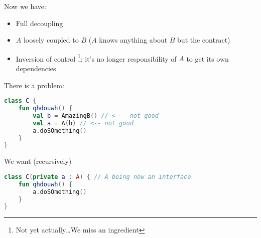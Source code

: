 \documentclass[10pt]{beamer}
\newcommand{\mycomment}[1]{}
\begin{document}
\begin{frame}[fragile]
	Now we have:
	\begin{itemize}
		\item Full decoupling
		\item $A$ loosely coupled to $B$ ($A$ knows anything about $B$ but the contract) 
		\item Inversion of control%
			\footnote{Not yet actually\ldots We miss an ingredient}: it's no longer responsibility of $A$ to get its own dependencies 
	\end{itemize}
\end{frame}
\mycomment{
\begin{frame}[fragile]
\begin{lstlisting}[language=Kotlin, basicstyle=\ttfamily]
interface Transaction

interface Store { // repository/gateway pattern
    fun fetch(id : String) : Transaction
}

class UseCase(val store: Store) { /* .. */ }

\end{lstlisting} 
\end{frame}
\begin{frame}[fragile]
\begin{lstlisting}[language=Kotlin, basicstyle=\ttfamily]
class BaseStore : Store {
    override fun fetch(id : String): Transaction {/*...*/}
}

// Delegation pattern
class StoreA(val store: Store) : Store by store {
    override fun fetch(id : String): Transactions {
        /* do something */
    }
}

// Delegation pattern 
class StoreB(val store: Store) : Store by store {
    override fun fetch(id : String): Transactions {
        /* do something else */
    }
}
\end{lstlisting} 
\end{frame}
}
\begin{frame}[fragile]
	There is a problem:
\begin{lstlisting}[language=Kotlin, basicstyle=\ttfamily]
class C {
    fun qhdouwh() {
        val b = AmazingB() // <--  not good 
        val a = A(b) // <-- not good 
        a.doSOmething()
    }
}
\end{lstlisting} 
\end{frame}
\begin{frame}[fragile]
	We want (recursively) 
\begin{lstlisting}[language=Kotlin, basicstyle=\ttfamily]
class C(private a : A) { // A being now an interface 
    fun qhdouwh() {
        a.doSOmething()
    }
}
\end{lstlisting} 
\end{frame}
\end{document}
